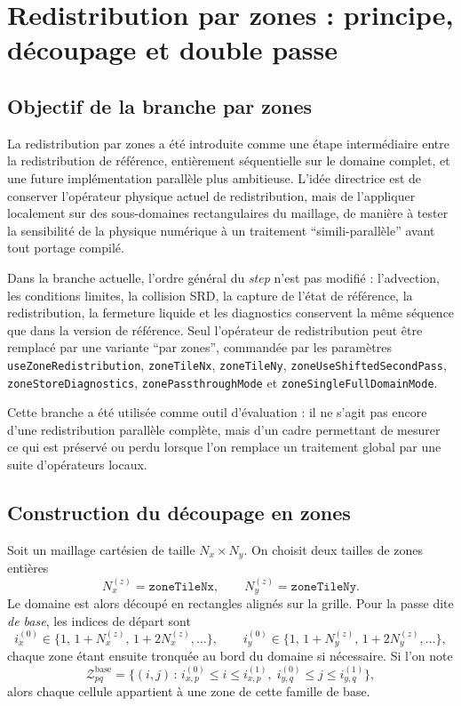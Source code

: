 \documentclass[11pt,a4paper]{article}
\begin{document}
\section{Redistribution par zones : principe, découpage et double passe}

\subsection{Objectif de la branche par zones}

La redistribution par zones a été introduite comme une étape intermédiaire entre la redistribution de référence, entièrement séquentielle sur le domaine complet, et une future implémentation parallèle plus ambitieuse. L'idée directrice est de conserver l'opérateur physique actuel de redistribution, mais de l'appliquer localement sur des sous-domaines rectangulaires du maillage, de manière à tester la sensibilité de la physique numérique à un traitement ``simili-parallèle'' avant tout portage compilé.

Dans la branche actuelle, l'ordre général du \emph{step} n'est pas modifié : l'advection, les conditions limites, la collision SRD, la capture de l'état de référence, la redistribution, la fermeture liquide et les diagnostics conservent la même séquence que dans la version de référence. Seul l'opérateur de redistribution peut être remplacé par une variante ``par zones'', commandée par les paramètres \verb|useZoneRedistribution|, \verb|zoneTileNx|, \verb|zoneTileNy|, \verb|zoneUseShiftedSecondPass|, \verb|zoneStoreDiagnostics|, \verb|zonePassthroughMode| et \verb|zoneSingleFullDomainMode|.

Cette branche a été utilisée comme outil d'évaluation : il ne s'agit pas encore d'une redistribution parallèle complète, mais d'un cadre permettant de mesurer ce qui est préservé ou perdu lorsque l'on remplace un traitement global par une suite d'opérateurs locaux.

\subsection{Construction du découpage en zones}

Soit un maillage cartésien de taille $N_x \times N_y$. On choisit deux tailles de zones entières
\begin{equation}
N_x^{(z)} = \texttt{zoneTileNx},
\qquad
N_y^{(z)} = \texttt{zoneTileNy}.
\end{equation}
Le domaine est alors découpé en rectangles alignés sur la grille. Pour la passe dite \emph{de base}, les indices de départ sont
\begin{equation}
 i_x^{(0)} \in \{1,\,1+N_x^{(z)},\,1+2N_x^{(z)},\dots\},
 \qquad
 i_y^{(0)} \in \{1,\,1+N_y^{(z)},\,1+2N_y^{(z)},\dots\},
\end{equation}
chaque zone étant ensuite tronquée au bord du domaine si nécessaire. Si l'on note
\begin{equation}
\mathcal Z_{pq}^{\mathrm{base}} = \{(i,j)\, :\, i_{x,p}^{(0)} \le i \le i_{x,p}^{(1)},\; i_{y,q}^{(0)} \le j \le i_{y,q}^{(1)}\},
\end{equation}
alors chaque cellule appartient à une zone de cette famille de base.
\end{document}
